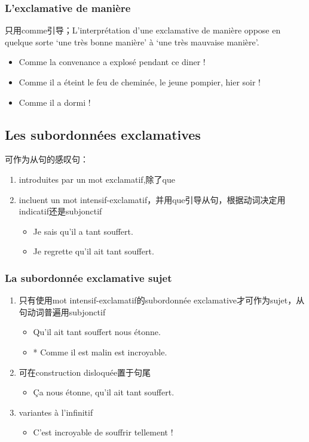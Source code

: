 \documentclass[UTF8]{report}
\begin{document}
\subsubsection{L’exclamative de manière}
只用comme引导；L’interprétation d’une exclamative de manière oppose en quelque sorte ‘une très bonne manière’ à ‘une très mauvaise manière’. 
\begin{itemize}
    \item Comme la convenance a explosé pendant ce diner !
    \item Comme il a éteint le feu de cheminée, le jeune pompier, hier soir !
    \item Comme il a dormi !
\end{itemize}


\subsection{Les subordonnées exclamatives}
可作为从句的感叹句：
\begin{enumerate}
    \item introduites par un mot exclamatif,除了que
    \item incluent un mot intensif-exclamatif，并用que引导从句，根据动词决定用indicatif还是subjonctif
    \begin{itemize}
        \item Je sais qu’il a tant souffert. 
        \item Je regrette qu’il ait tant souffert.
    \end{itemize}
\end{enumerate}


\subsubsection{La subordonnée exclamative sujet}
\begin{enumerate}
    \item 只有使用mot intensif-exclamatif的subordonnée exclamative才可作为sujet，从句动词普遍用subjonctif
    \begin{itemize}
        \item Qu’il ait tant souffert nous étonne.
        \item * Comme il est malin est incroyable.
    \end{itemize}
    \item 可在construction disloquée置于句尾
    \begin{itemize}
        \item Ça nous étonne, qu’il ait tant souffert.
    \end{itemize}
    \item variantes à l’infinitif
    \begin{itemize}
        \item C’est incroyable de souffrir tellement !
    \end{itemize}
\end{enumerate}
\end{document}
